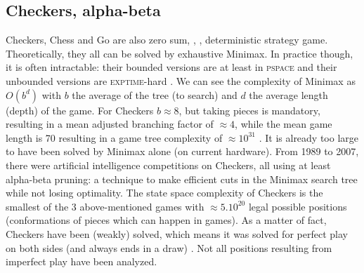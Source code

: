 \subsection{Checkers, alpha-beta}
Checkers, Chess and Go are also zero sum, , , deterministic strategy game. Theoretically, they all can be solved by exhaustive Minimax. 
In practice though, it is often intractable: their bounded versions are at least in \textsc{pspace} and their unbounded versions are \textsc{exptime}-hard \citep{GPC}. We can see the complexity of Minimax as $O(b^d)$ with $b$ the average  of the tree (to search) and $d$ the average length (depth) of the game. 
For Checkers $b \approx 8$, but taking pieces is mandatory, resulting in a mean adjusted branching factor of $\approx 4$, while the mean game length is 70 resulting in a game tree complexity of $\approx 10^{31}$ \citep{allis1994}. It is already too large to have been solved by Minimax alone (on current hardware). From 1989 to 2007, there were artificial intelligence competitions on Checkers, all using at least alpha-beta pruning: a technique to make efficient cuts in the Minimax search tree while not losing optimality. 
The state space complexity of Checkers is the smallest of the 3 above-mentioned games with $\approx 5.10^{20}$ legal possible positions (conformations of pieces which can happen in games). As a matter of fact, Checkers have been (weakly) solved, which means it was solved for perfect play on both sides (and always ends in a draw) \citep{Schaeffer07}. Not all positions resulting from imperfect play have been analyzed. 

